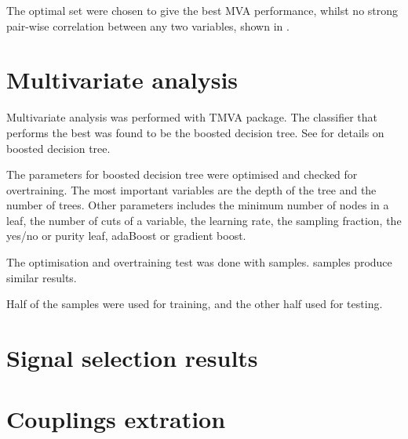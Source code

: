 The optimal set were chosen to give the best MVA performance, whilst no strong pair-wise correlation between any two variables, shown in \Figure{}.



\section{Multivariate analysis}

Multivariate analysis was performed with TMVA package. The classifier that performs the best was found to be the boosted decision tree. See \Section{} for details on boosted decision tree.

The parameters for boosted decision tree were optimised and checked for overtraining. The most important variables are the depth of the tree and the number of trees. Other parameters includes the minimum number of nodes in a leaf, the number of cuts of a variable, the learning rate, the sampling fraction, the yes/no or purity leaf, adaBoost or gradient boost.

The optimisation and overtraining test was done with  samples.  samples produce similar results.

Half of the samples were used for training, and the other half used for testing.


\section{Signal selection results}

\section{Couplings extration} 